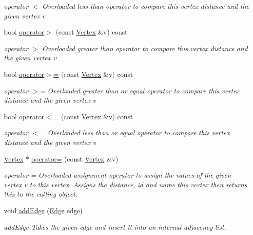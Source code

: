 \begin{DoxyCompactItemize}
\begin{DoxyCompactList}\small\item\em operator $<$ Overloaded less than operator to compare this vertex distance and the given vertex v \end{DoxyCompactList}\item 
bool \hyperlink{class_vertex_a85bf76a3a2212f0d5d81e327f9eecd65}{operator$>$} (const \hyperlink{class_vertex}{Vertex} \&v) const 
\begin{DoxyCompactList}\small\item\em operator $>$ Overloaded greater than operator to compare this vertex distance and the given vertex v \end{DoxyCompactList}\item 
bool \hyperlink{class_vertex_a9a9c7ae24773341a58343809e5fa511f}{operator$>$=} (const \hyperlink{class_vertex}{Vertex} \&v) const 
\begin{DoxyCompactList}\small\item\em operator $>$= Overloaded greater than or equal operator to compare this vertex distance and the given vertex v \end{DoxyCompactList}\item 
bool \hyperlink{class_vertex_a5c45e745c39aeea6dd713d3ce7b5c023}{operator$<$=} (const \hyperlink{class_vertex}{Vertex} \&v) const 
\begin{DoxyCompactList}\small\item\em operator $<$= Overloaded less than or equal operator to compare this vertex distance and the given vertex v \end{DoxyCompactList}\item 
\hyperlink{class_vertex}{Vertex} $\ast$ \hyperlink{class_vertex_ae08494c23f6d03a242c2ff0ef0679865}{operator=} (const \hyperlink{class_vertex}{Vertex} \&v)
\begin{DoxyCompactList}\small\item\em operator = Overloaded assignment operator to assign the values of the given vertex v to this vertex. Assigns the distance, id and name this vertex then returns \textquotesingle{}this\textquotesingle{} to the calling object. \end{DoxyCompactList}\item 
void \hyperlink{class_vertex_a700e64ce39492162ebd5ec2cb5cdea45}{add\+Edge} (\hyperlink{struct_edge}{Edge} edge)
\begin{DoxyCompactList}\small\item\em add\+Edge Takes the given edge and insert it into an internal adjacency list. \end{DoxyCompactList}\item 

\end{DoxyCompactItemize}
